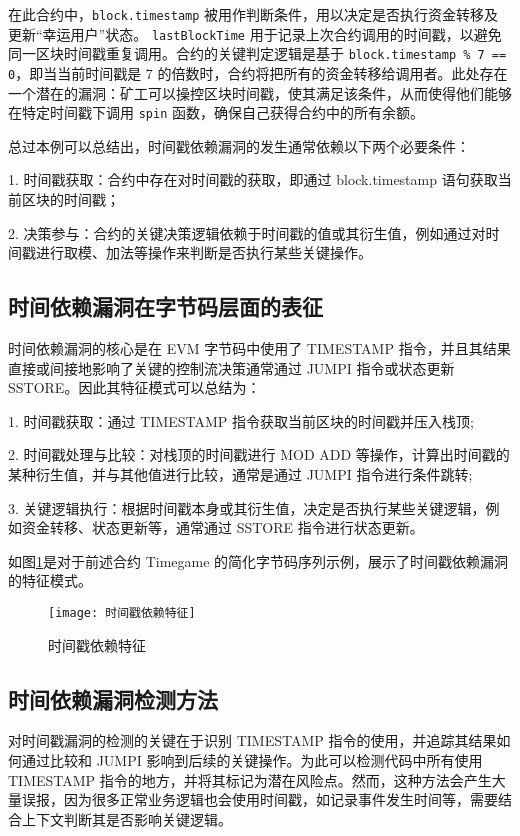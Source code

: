 \documentclass[print, master, vlined, timesmath]{DissertUESTC}
\begin{document}
在此合约中，\texttt{block.timestamp} 被用作判断条件，用以决定是否执行资金转移及更新“幸运用户”状态。 \texttt{lastBlockTime} 用于记录上次合约调用的时间戳，以避免同一区块时间戳重复调用。合约的关键判定逻辑是基于 \texttt{block.timestamp \% 7 == 0}，即当当前时间戳是 7 的倍数时，合约将把所有的资金转移给调用者。此处存在一个潜在的漏洞：矿工可以操控区块时间戳，使其满足该条件，从而使得他们能够在特定时间戳下调用 \texttt{spin} 函数，确保自己获得合约中的所有余额。

总过本例可以总结出，时间戳依赖漏洞的发生通常依赖以下两个必要条件：

1. 时间戳获取：合约中存在对时间戳的获取，即通过 block.timestamp 语句获取当前区块的时间戳；

2. 决策参与：合约的关键决策逻辑依赖于时间戳的值或其衍生值，例如通过对时间戳进行取模、加法等操作来判断是否执行某些关键操作。

\subsection{时间依赖漏洞在字节码层面的表征}


时间依赖漏洞的核心是在 EVM 字节码中使用了 TIMESTAMP 指令，并且其结果直接或间接地影响了关键的控制流决策通常通过 JUMPI 指令或状态更新 SSTORE。因此其特征模式可以总结为：

1. 时间戳获取：通过 TIMESTAMP 指令获取当前区块的时间戳并压入栈顶;

2. 时间戳处理与比较：对栈顶的时间戳进行 MOD ADD 等操作，计算出时间戳的某种衍生值，并与其他值进行比较，通常是通过 JUMPI 指令进行条件跳转;

3. 关键逻辑执行：根据时间戳本身或其衍生值，决定是否执行某些关键逻辑，例如资金转移、状态更新等，通常通过 SSTORE 指令进行状态更新。

如图\ref{fig:时间戳依赖特征}是对于前述合约 Timegame 的简化字节码序列示例，展示了时间戳依赖漏洞的特征模式。



\begin{figure}[h]
    \centering
    \texttt{[image: 时间戳依赖特征]}
    \caption{时间戳依赖特征}
    \label{fig:时间戳依赖特征}
\end{figure}

\subsection{时间依赖漏洞检测方法}
对时间戳漏洞的检测的关键在于识别 TIMESTAMP 指令的使用，并追踪其结果如何通过比较和 JUMPI 影响到后续的关键操作。为此可以检测代码中所有使用 TIMESTAMP 指令的地方，并将其标记为潜在风险点。然而，这种方法会产生大量误报，因为很多正常业务逻辑也会使用时间戳，如记录事件发生时间等，需要结合上下文判断其是否影响关键逻辑。
\end{document}
